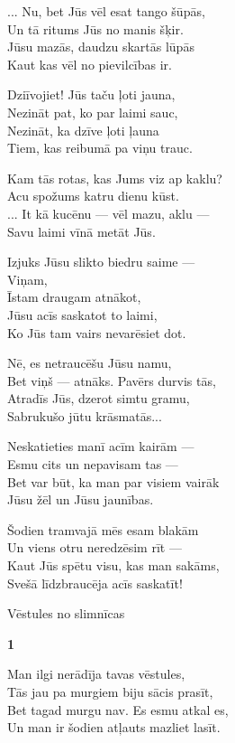 \documentclass[14pt]{extarticle}
\begin{document}
{{... Nu, bet Jūs vēl esat tango šūpās,\\
Un tā ritums Jūs no manis šķir.\\
Jūsu mazās, daudzu skartās lūpās\\
Kaut kas vēl no pievilcības ir. 

Dziīvojiet! Jūs taču ļoti jauna,\\
Nezināt pat, ko par laimi sauc,\\
Nezināt, ka dzīve ļoti ļauna\\
Tiem, kas reibumā pa viņu trauc. 

Kam tās rotas, kas Jums viz ap kaklu?\\
Acu spožums katru dienu kūst.\\
... It kā kucēnu --- vēl mazu, aklu ---\\
Savu laimi vīnā metāt Jūs. 

Izjuks Jūsu slikto biedru saime ---\\
Viņam,\\
Īstam draugam atnākot,\\
Jūsu acīs saskatot to laimi,\\
Ko Jūs tam vairs nevarēsiet dot.

Nē, es netraucēšu Jūsu namu,\\
Bet viņš --- atnāks. Pavērs durvis tās,\\
Atradīs Jūs, dzerot simtu gramu,\\
Sabrukušo jūtu krāsmatās...

Neskatieties manī acīm kairām ---\\
Esmu cits un nepavisam tas ---\\
Bet var būt, ka man par visiem vairāk\\
Jūsu žēl un Jūsu jaunības.

Šodien tramvajā mēs esam blakām\\
Un viens otru neredzēsim rīt ---\\
Kaut Jūs spētu visu, kas man sakāms,\\
Svešā līdzbraucēja acīs saskatīt!


\newpage

{\large \sc Vēstules no slimnīcas}

{\bf 1}

Man ilgi nerādīja tavas vēstules,\\
Tās jau pa murgiem biju sācis prasīt,\\
Bet tagad murgu nav. Es esmu atkal es,\\
Un man ir šodien atļauts mazliet lasīt. 

}}
\end{document}
